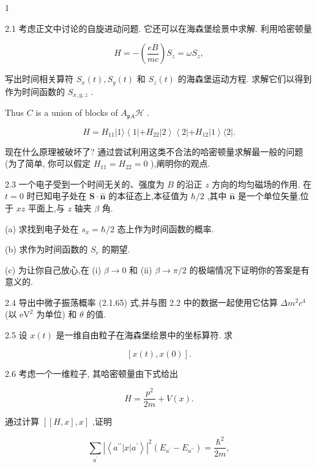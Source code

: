 \begin{problemset}
\item 1
\end{problemset}

2.1 考虑正文中讨论的自旋进动问题. 它还可以在海森堡绘景中求解. 利用哈密顿量

$$
H = - \left( \frac{eB}{mc}\right) {S}_{z} = \omega {S}_{z},
$$

写出时间相关算符 ${S}_{x}\left( t\right) ,{S}_{y}\left( t\right)$ 和 ${S}_{z}\left( t\right)$ 的海森堡运动方程. 求解它们以得到作为时间函数的 ${S}_{x, y, z}$ .

Thus $C$ is a union of blocks of ${A}_{\mathfrak{p}A}\mathcal{H}$ .

$$
H = {H}_{11}\left| {1\rangle \left\langle {1\left| {+{H}_{22}}\right| 2}\right\rangle \left\langle {2\left| {+{H}_{12}}\right| 1}\right\rangle \langle 2}\right| .
$$

现在什么原理被破坏了? 通过尝试利用这类不合法的哈密顿量求解最一般的问题 (为了简单, 你可以假定 ${H}_{11} = {H}_{22} = 0$ ),阐明你的观点.

2.3 一个电子受到一个时间无关的、强度为 $B$ 的沿正 $z$ 方向的均匀磁场的作用. 在 $t = 0$ 时已知电子处在 $\mathbf{S} \cdot \widehat{\mathbf{n}}$ 的本征态上,本征值为 $\hbar /2$ ,其中 $\widehat{\mathbf{n}}$ 是一个单位矢量,位于 ${xz}$ 平面上,与 $z$ 轴夹 $\beta$ 角.

(a) 求找到电子处在 ${s}_{x} = \hbar /2$ 态上作为时间函数的概率.

(b) 求作为时间函数的 ${S}_{r}$ 的期望.

(c) 为让你自己放心,在 (i) $\beta \rightarrow 0$ 和 (ii) $\beta \rightarrow \pi /2$ 的极端情况下证明你的答案是有意义的.

2.4 导出中微子振荡概率 (2.1.65) 式,并与图 2.2 中的数据一起使用它估算 $\Delta {m}^{2}{c}^{4}$ (以 ${\mathrm{{eV}}}^{2}$ 为单位) 和 $\theta$ 的值.

2.5 设 $x\left( t\right)$ 是一维自由粒子在海森堡绘景中的坐标算符. 求

$$
\left\lbrack {x\left( t\right), x\left( 0\right) }\right\rbrack \text{.}
$$

2.6 考虑一个一维粒子, 其哈密顿量由下式给出

$$
H = \frac{{p}^{2}}{2m} + V\left( x\right) .
$$

通过计算 $\left\lbrack {\left\lbrack {H, x}\right\rbrack, x}\right\rbrack$ ,证明

$$
\mathop{\sum }\limits_{{a}^{\prime }}{\left| \left\langle {a}^{\prime \prime }\left| x\right| {a}^{\prime }\right\rangle \right| }^{2}\left( {{E}_{{a}^{\prime }} - {E}_{{a}^{\prime \prime }}}\right) = \frac{{\hbar }^{2}}{2m},
$$

